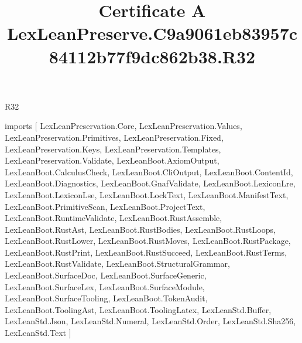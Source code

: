 \begin{lexlean}{R32}
\title{Certificate A LexLeanPreserve.C9a9061eb83957c84112b77f9dc862b38.R32}
\begin{coremodule}
imports [
  LexLeanPreservation.Core,
  LexLeanPreservation.Values,
  LexLeanPreservation.Primitives,
  LexLeanPreservation.Fixed,
  LexLeanPreservation.Keys,
  LexLeanPreservation.Templates,
  LexLeanPreservation.Validate,
  LexLeanBoot.AxiomOutput,
  LexLeanBoot.CalculusCheck,
  LexLeanBoot.CliOutput,
  LexLeanBoot.ContentId,
  LexLeanBoot.Diagnostics,
  LexLeanBoot.GnafValidate,
  LexLeanBoot.LexiconLre,
  LexLeanBoot.LexiconLse,
  LexLeanBoot.LockText,
  LexLeanBoot.ManifestText,
  LexLeanBoot.PrimitiveScan,
  LexLeanBoot.ProjectText,
  LexLeanBoot.RuntimeValidate,
  LexLeanBoot.RustAssemble,
  LexLeanBoot.RustAst,
  LexLeanBoot.RustBodies,
  LexLeanBoot.RustLoops,
  LexLeanBoot.RustLower,
  LexLeanBoot.RustMoves,
  LexLeanBoot.RustPackage,
  LexLeanBoot.RustPrint,
  LexLeanBoot.RustSucceed,
  LexLeanBoot.RustTerms,
  LexLeanBoot.RustValidate,
  LexLeanBoot.StructuralGrammar,
  LexLeanBoot.SurfaceDoc,
  LexLeanBoot.SurfaceGeneric,
  LexLeanBoot.SurfaceLex,
  LexLeanBoot.SurfaceModule,
  LexLeanBoot.SurfaceTooling,
  LexLeanBoot.TokenAudit,
  LexLeanBoot.ToolingAst,
  LexLeanBoot.ToolingLatex,
  LexLeanStd.Buffer,
  LexLeanStd.Json,
  LexLeanStd.Numeral,
  LexLeanStd.Order,
  LexLeanStd.Sha256,
  LexLeanStd.Text
]


\end{coremodule}
\end{lexlean}
